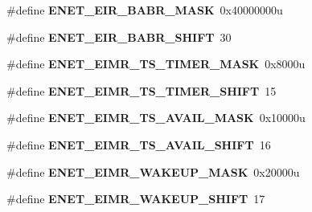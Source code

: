 \begin{DoxyCompactItemize}
\item 
\hypertarget{group___e_n_e_t___register___masks_gaa0d5f950cb5b2252eda9744944f88f17}{}\#define {\bfseries E\+N\+E\+T\+\_\+\+E\+I\+R\+\_\+\+B\+A\+B\+R\+\_\+\+M\+A\+S\+K}~0x40000000u\label{group___e_n_e_t___register___masks_gaa0d5f950cb5b2252eda9744944f88f17}

\item 
\hypertarget{group___e_n_e_t___register___masks_gabde85bd2d6099ccd0d7b5a48b648a3b2}{}\#define {\bfseries E\+N\+E\+T\+\_\+\+E\+I\+R\+\_\+\+B\+A\+B\+R\+\_\+\+S\+H\+I\+F\+T}~30\label{group___e_n_e_t___register___masks_gabde85bd2d6099ccd0d7b5a48b648a3b2}

\item 
\hypertarget{group___e_n_e_t___register___masks_gaf036db440c529ff6fefcb0117db93840}{}\#define {\bfseries E\+N\+E\+T\+\_\+\+E\+I\+M\+R\+\_\+\+T\+S\+\_\+\+T\+I\+M\+E\+R\+\_\+\+M\+A\+S\+K}~0x8000u\label{group___e_n_e_t___register___masks_gaf036db440c529ff6fefcb0117db93840}

\item 
\hypertarget{group___e_n_e_t___register___masks_ga3ae1d93529feddafe084f0c4709758b1}{}\#define {\bfseries E\+N\+E\+T\+\_\+\+E\+I\+M\+R\+\_\+\+T\+S\+\_\+\+T\+I\+M\+E\+R\+\_\+\+S\+H\+I\+F\+T}~15\label{group___e_n_e_t___register___masks_ga3ae1d93529feddafe084f0c4709758b1}

\item 
\hypertarget{group___e_n_e_t___register___masks_gadb2e7c3e600fe3ea3694c9ebf8460f93}{}\#define {\bfseries E\+N\+E\+T\+\_\+\+E\+I\+M\+R\+\_\+\+T\+S\+\_\+\+A\+V\+A\+I\+L\+\_\+\+M\+A\+S\+K}~0x10000u\label{group___e_n_e_t___register___masks_gadb2e7c3e600fe3ea3694c9ebf8460f93}

\item 
\hypertarget{group___e_n_e_t___register___masks_ga7af0adce91f65d4127770cbea42a00e7}{}\#define {\bfseries E\+N\+E\+T\+\_\+\+E\+I\+M\+R\+\_\+\+T\+S\+\_\+\+A\+V\+A\+I\+L\+\_\+\+S\+H\+I\+F\+T}~16\label{group___e_n_e_t___register___masks_ga7af0adce91f65d4127770cbea42a00e7}

\item 
\hypertarget{group___e_n_e_t___register___masks_ga5a8c25f893ae181e80d0be797b4629f3}{}\#define {\bfseries E\+N\+E\+T\+\_\+\+E\+I\+M\+R\+\_\+\+W\+A\+K\+E\+U\+P\+\_\+\+M\+A\+S\+K}~0x20000u\label{group___e_n_e_t___register___masks_ga5a8c25f893ae181e80d0be797b4629f3}

\item 
\hypertarget{group___e_n_e_t___register___masks_ga1a9b8710bbb85a58d145dc2b9ad55499}{}\#define {\bfseries E\+N\+E\+T\+\_\+\+E\+I\+M\+R\+\_\+\+W\+A\+K\+E\+U\+P\+\_\+\+S\+H\+I\+F\+T}~17\label{group___e_n_e_t___register___masks_ga1a9b8710bbb85a58d145dc2b9ad55499}


\end{DoxyCompactItemize}
